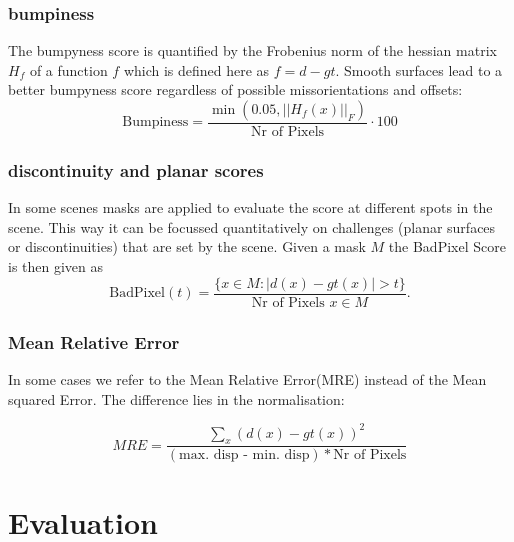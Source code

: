 \documentclass  [
  paper    = a4,
  BCOR     = 10mm,
  twoside,
  fontsize = 12pt,
  fleqn,
  toc      = bibnumbered,
  toc      = listofnumbered,
  numbers  = noendperiod,
  headings = normal,
  listof   = leveldown,
  version  = 3.03
]                                       {scrreprt}
\begin{document}
\subsection{bumpiness}
The bumpyness score is quantified by the Frobenius norm of the hessian matrix $H_f$ of a function $f$ which is defined here as $f = d-gt$. Smooth surfaces lead to a better bumpyness score regardless of possible missorientations and offsets:
\begin{equation}\label{key}
\text{Bumpiness} = \frac{\min(0.05, ||H_f(x)||_F)}{\text{Nr of Pixels}} \cdot 100
\end{equation}
\subsection{discontinuity and planar scores}
In some scenes masks are applied to evaluate the score at different spots in the scene. This way it can be focussed quantitatively on challenges (planar surfaces or discontinuities) that are set by the scene. Given a mask $M$ the BadPixel Score is then given as 
\begin{equation}\label{key}
\text{BadPixel}(t) = \frac{\{x \in M:|d(x) - gt(x)| > t \}}{\text{Nr of Pixels }x \in M}.
\end{equation}
\subsection{Mean Relative Error}
In some cases we refer to the Mean Relative Error(MRE) instead of the Mean squared Error. The difference lies in the normalisation:

\begin{equation}\label{key}
MRE = \frac{\sum_{x} (d(x) - gt(x) )^2}{(\text{max. disp - min. disp})* \text{Nr of Pixels}}
\end{equation}



\chapter{Evaluation}
\label{Evaluation}
\end{document}
